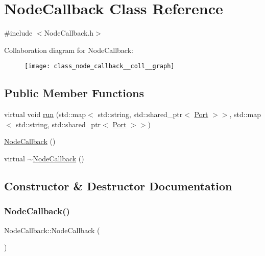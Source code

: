 \hypertarget{class_node_callback}{}\section{Node\+Callback Class Reference}
\label{class_node_callback}


{\ttfamily \#include $<$Node\+Callback.\+h$>$}



Collaboration diagram for Node\+Callback\+:
\nopagebreak
\begin{figure}[H]
\begin{center}
\leavevmode
\texttt{[image: class\_node\_callback\_\_coll\_\_graph]}
\end{center}
\end{figure}
\subsection*{Public Member Functions}
\begin{DoxyCompactItemize}
\item 
virtual void \hyperlink{class_node_callback_a94eb8c2fd7162ffcc4abff8bd2e852b3}{run} (std\+::map$<$ std\+::string, std\+::shared\+\_\+ptr$<$ \hyperlink{class_port}{Port} $>$$>$, std\+::map$<$ std\+::string, std\+::shared\+\_\+ptr$<$ \hyperlink{class_port}{Port} $>$$>$)
\item 
\hyperlink{class_node_callback_a91f8bc71a7bc6164d831ab4fb8144810}{Node\+Callback} ()
\item 
virtual \hyperlink{class_node_callback_ac9474867612b9fa6327dfe5cc5d29bec}{$\sim$\+Node\+Callback} ()
\end{DoxyCompactItemize}


\subsection{Constructor \& Destructor Documentation}
\mbox{\label{class_node_callback_a91f8bc71a7bc6164d831ab4fb8144810}} 
\subsubsection{\texorpdfstring{Node\+Callback()}{NodeCallback()}}
{\footnotesize\ttfamily Node\+Callback\+::\+Node\+Callback (\begin{DoxyParamCaption}{ }\end{DoxyParamCaption})\hspace{0.3cm}{\ttfamily [inline]}}

